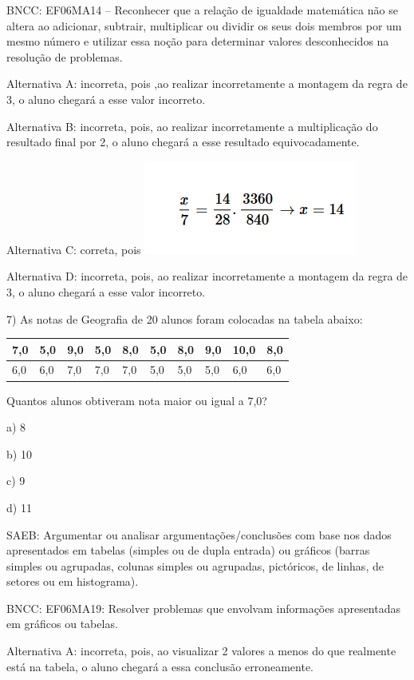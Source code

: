 BNCC: EF06MA14 -- Reconhecer que a relação de igualdade matemática não
se altera ao adicionar, subtrair, multiplicar ou dividir os seus dois
membros por um mesmo número e utilizar essa noção para determinar
valores desconhecidos na resolução de problemas.

Alternativa A: incorreta, pois ,ao realizar incorretamente a montagem da
regra de 3, o aluno chegará a esse valor incorreto.

Alternativa B: incorreta, pois, ao realizar incorretamente a
multiplicação do resultado final por 2, o aluno chegará a esse resultado
equivocadamente.

Alternativa C: correta, pois
\includegraphics[width=2.76042in,height=1.20833in]{./imgSAEB_6_MAT/media/image116.png}

Alternativa D: incorreta, pois, ao realizar incorretamente a montagem da
regra de 3, o aluno chegará a esse valor incorreto.

7) As notas de Geografia de 20 alunos foram colocadas na tabela abaixo:


\begin{longtable}[]{@{}llllllllll@{}}
\toprule
7,0 & 5,0 & 9,0 & 5,0 & 8,0 & 5,0 & 8,0 & 9,0 & 10,0 &
8,0\tabularnewline
\midrule
\endhead
6,0 & 6,0 & 7,0 & 7,0 & 7,0 & 5,0 & 5,0 & 5,0 & 6,0 & 6,0\tabularnewline
\bottomrule
\end{longtable}

Quantos alunos obtiveram nota maior ou igual a 7,0?

a) 8

b) 10

c) 9

d) 11

SAEB: Argumentar ou analisar argumentações/conclusões com base nos dados
apresentados em tabelas (simples ou de dupla entrada) ou gráficos
(barras simples ou agrupadas, colunas simples ou agrupadas, pictóricos,
de linhas, de setores ou em histograma).

BNCC: EF06MA19: Resolver problemas que envolvam informações apresentadas
em gráficos ou tabelas.~

Alternativa A: incorreta, pois, ao visualizar 2 valores a menos do que
realmente está na tabela, o aluno chegará a essa conclusão erroneamente.

